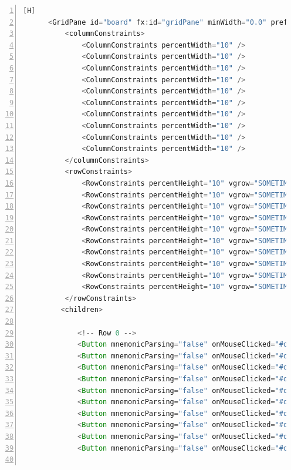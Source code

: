 \documentclass{article}
\begin{document}
\begin{lstlisting}[language=java,caption={Archivo FXML}, numbers=left][H]
      <GridPane id="board" fx:id="gridPane" minWidth="0.0" prefHeight="330.0" prefWidth="352.0">
          <columnConstraints>
              <ColumnConstraints percentWidth="10" />
              <ColumnConstraints percentWidth="10" />
              <ColumnConstraints percentWidth="10" />
              <ColumnConstraints percentWidth="10" />
              <ColumnConstraints percentWidth="10" />
              <ColumnConstraints percentWidth="10" />
              <ColumnConstraints percentWidth="10" />
              <ColumnConstraints percentWidth="10" />
              <ColumnConstraints percentWidth="10" />
              <ColumnConstraints percentWidth="10" />
          </columnConstraints>
          <rowConstraints>
              <RowConstraints percentHeight="10" vgrow="SOMETIMES" />
              <RowConstraints percentHeight="10" vgrow="SOMETIMES" />
              <RowConstraints percentHeight="10" vgrow="SOMETIMES" />
              <RowConstraints percentHeight="10" vgrow="SOMETIMES" />
              <RowConstraints percentHeight="10" vgrow="SOMETIMES" />
              <RowConstraints percentHeight="10" vgrow="SOMETIMES" />
              <RowConstraints percentHeight="10" vgrow="SOMETIMES" />
              <RowConstraints percentHeight="10" vgrow="SOMETIMES" />
              <RowConstraints percentHeight="10" vgrow="SOMETIMES" />
              <RowConstraints percentHeight="10" vgrow="SOMETIMES" />
          </rowConstraints>
         <children>

             <!-- Row 0 -->
             <Button mnemonicParsing="false" onMouseClicked="#onButtonClick" styleClass="button" text="" GridPane.columnIndex="0" GridPane.rowIndex="0" />
             <Button mnemonicParsing="false" onMouseClicked="#onButtonClick" styleClass="button" text="" GridPane.columnIndex="1" GridPane.rowIndex="0" />
             <Button mnemonicParsing="false" onMouseClicked="#onButtonClick" styleClass="button" text="" GridPane.columnIndex="2" GridPane.rowIndex="0" />
             <Button mnemonicParsing="false" onMouseClicked="#onButtonClick" styleClass="button" text="" GridPane.columnIndex="3" GridPane.rowIndex="0" />
             <Button mnemonicParsing="false" onMouseClicked="#onButtonClick" styleClass="button" text="" GridPane.columnIndex="4" GridPane.rowIndex="0" />
             <Button mnemonicParsing="false" onMouseClicked="#onButtonClick" styleClass="button" text="" GridPane.columnIndex="5" GridPane.rowIndex="0" />
             <Button mnemonicParsing="false" onMouseClicked="#onButtonClick" styleClass="button" text="" GridPane.columnIndex="6" GridPane.rowIndex="0" />
             <Button mnemonicParsing="false" onMouseClicked="#onButtonClick" styleClass="button" text="" GridPane.columnIndex="7" GridPane.rowIndex="0" />
             <Button mnemonicParsing="false" onMouseClicked="#onButtonClick" styleClass="button" text="" GridPane.columnIndex="8" GridPane.rowIndex="0" />
             <Button mnemonicParsing="false" onMouseClicked="#onButtonClick" styleClass="button" text="" GridPane.columnIndex="9" GridPane.rowIndex="0" />


\end{lstlisting}
\end{document}
